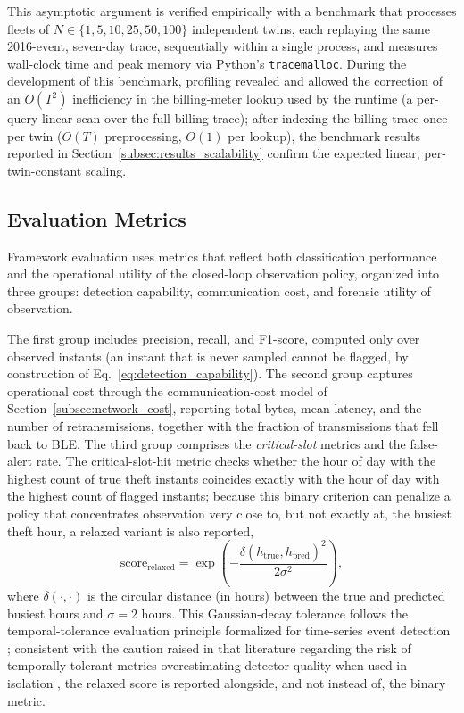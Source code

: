 \documentclass{ieeeaccess}
\begin{document}
This asymptotic argument is verified empirically with a benchmark that processes fleets of $N \in \{1, 5, 10, 25, 50, 100\}$ independent twins, each replaying the same 2016-event, seven-day trace, sequentially within a single process, and measures wall-clock time and peak memory via Python's \texttt{tracemalloc}. During the development of this benchmark, profiling revealed and allowed the correction of an $O(T^2)$ inefficiency in the billing-meter lookup used by the runtime (a per-query linear scan over the full billing trace); after indexing the billing trace once per twin ($O(T)$ preprocessing, $O(1)$ per lookup), the benchmark results reported in Section~\ref{subsec:results_scalability} confirm the expected linear, per-twin-constant scaling.

\subsection{Evaluation Metrics}
\label{subsec:metrics}
Framework evaluation uses metrics that reflect both classification performance and the operational utility of the closed-loop observation policy, organized into three groups: detection capability, communication cost, and forensic utility of observation.

The first group includes precision, recall, and F1-score, computed only over observed instants (an instant that is never sampled cannot be flagged, by construction of Eq.~\eqref{eq:detection_capability}). The second group captures operational cost through the communication-cost model of Section~\ref{subsec:network_cost}, reporting total bytes, mean latency, and the number of retransmissions, together with the fraction of transmissions that fell back to BLE. The third group comprises the \textit{critical-slot} metrics and the false-alert rate. The critical-slot-hit metric checks whether the hour of day with the highest count of true theft instants coincides exactly with the hour of day with the highest count of flagged instants; because this binary criterion can penalize a policy that concentrates observation very close to, but not exactly at, the busiest theft hour, a relaxed variant is also reported,
\begin{equation}
\text{score}_{\text{relaxed}} = \exp\!\left(-\frac{\delta(h_{\text{true}}, h_{\text{pred}})^2}{2\sigma^2}\right),
\label{eq:relaxed_critical_slot}
\end{equation}
where $\delta(\cdot,\cdot)$ is the circular distance (in hours) between the true and predicted busiest hours and $\sigma = 2$ hours. This Gaussian-decay tolerance follows the temporal-tolerance evaluation principle formalized for time-series event detection \cite{b36,b37}; consistent with the caution raised in that literature regarding the risk of temporally-tolerant metrics overestimating detector quality when used in isolation \cite{b37}, the relaxed score is reported alongside, and not instead of, the binary metric.
\end{document}
